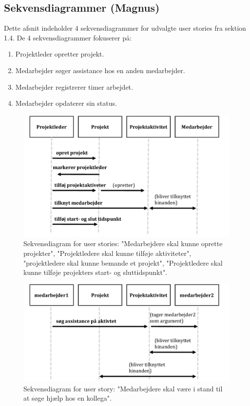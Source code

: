 \subsection{Sekvensdiagrammer (Magnus)}
Dette afsnit indeholder 4 sekvensdiagrammer for udvalgte user stories fra sektion 1.4. De 4 sekvensdiagrammer fokuserer på:

\begin{enumerate}
    \item Projektleder opretter projekt.
    \item Medarbejder søger assistance hos en anden medarbejder.
    \item Medarbejder registrerer timer arbejdet.
    \item Medarbejder opdaterer sin status.
\end{enumerate}
    
\begin{figure}[H]
    \centering
    \includegraphics[width=\textwidth]{Figurer/seq1_opretprojekt.pdf}
    \caption{Sekvensdiagram for user stories: "Medarbejdere skal kunne oprette projekter", "Projektledere skal kunne tilføje aktiviteter", "projektledere skal kunne bemande et projekt", "Projektledere skal kunne tilføje projekters start- og sluttidspunkt".}
    \label{fig:seq1_opretprojekt}
\end{figure}

\begin{figure}[H]
    \centering
    \includegraphics[width=\textwidth]{Figurer/seq2_assistance.pdf}
    \caption{Sekvensdiagram for user story: "Medarbejdere skal være i stand til at søge hjælp hos en kollega".}
    \label{fig:seq2_assistance}
\end{figure}

